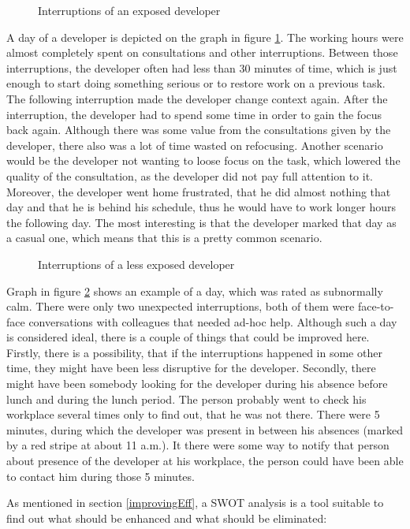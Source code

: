 \documentclass[11pt,singleside]{myfithesis2}
\newcommand{\pict}[4]{
	\begin{figure}[h!]
  		\vspace{-7px}
  		\centerline{\fcolorbox{darkgray}{palegray}{\texttt{[image: \#2]}}}
  		\caption{#1}
  		\label{#4}
	\end{figure}
}
\begin{document}
\pict{Interruptions of an exposed developer}{data/originalStatesExposed.png}{width=0.8\textwidth}{pic:originalStatesExposed}

A day of a developer is depicted on the graph in figure \ref{pic:originalStatesExposed}. The working hours were almost completely spent on consultations and other interruptions. Between those interruptions, the developer often had less than 30 minutes of time, which is just enough to start doing something serious or to restore work on a previous task. The following interruption made the developer change context again. After the interruption, the developer had to spend some time in order to gain the focus back again. Although there was some value from the consultations given by the developer, there also was a lot of time wasted on refocusing. Another scenario would be the developer not wanting to loose focus on the task, which lowered the quality of the consultation, as the developer did not pay full attention to it. Moreover, the developer went home frustrated, that he did almost nothing that day and that he is behind his schedule, thus he would have to work longer hours the following day. The most interesting is that the developer marked that day as a casual one, which means that this is a pretty common scenario.

\pict{Interruptions of a less exposed developer}{data/originalStatesNormal.png}{width=0.8\textwidth}{pic:originalStatesNormal}

Graph in figure \ref{pic:originalStatesNormal} shows an example of a day, which was rated as subnormally calm. There were only two unexpected interruptions, both of them were face-to-face conversations with colleagues that needed ad-hoc help. Although such a day is considered ideal, there is a couple of things that could be improved here. Firstly, there is a possibility, that if the interruptions happened in some other time, they might have been less disruptive for the developer. Secondly, there might have been somebody looking for the developer during his absence before lunch and during the lunch period. The person probably went to check his workplace several times only to find out, that he was not there. There were 5 minutes, during which the developer was present in between his absences (marked by a red stripe at about 11 a.m.). It there were some way to notify that person about presence of the developer at his workplace, the person could have been able to contact him during those 5 minutes.

As mentioned in section \ref{improvingEff}, a SWOT analysis is a tool suitable to find out what should be enhanced and what should be eliminated:
\end{document}
